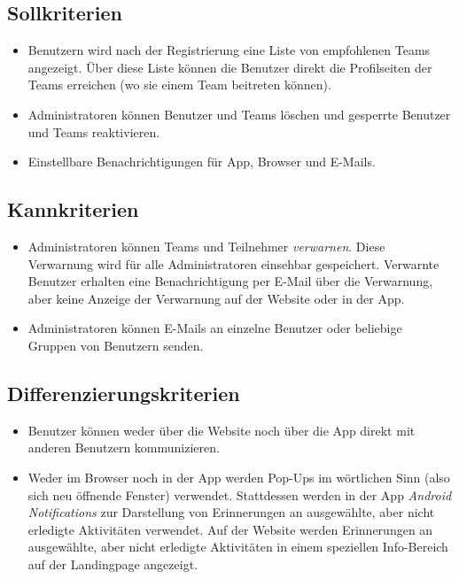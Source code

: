 \documentclass[10pt,a4paper]{article}
\begin{document}
	\subsection{Sollkriterien}
	\begin{itemize}
			\item Benutzern wird nach der Registrierung eine Liste von empfohlenen Teams angezeigt. Über diese Liste können die Benutzer direkt die Profilseiten der Teams erreichen (wo sie einem Team beitreten können).
			\item Administratoren können Benutzer und Teams löschen und gesperrte Benutzer und Teams reaktivieren.
			\item Einstellbare Benachrichtigungen für App, Browser und E-Mails.
		\end{itemize}
	\subsection{Kannkriterien}
	\begin{itemize}
                        \item Administratoren können Teams und Teilnehmer \emph{verwarnen}. Diese Verwarnung wird für alle Administratoren einsehbar gespeichert. Verwarnte Benutzer erhalten eine Benachrichtigung per E-Mail über die Verwarnung, aber keine Anzeige der Verwarnung auf der Website oder in der App.
			\item Administratoren können E-Mails an einzelne Benutzer oder beliebige Gruppen von Benutzern senden.
	\end{itemize}
	\subsection{Differenzierungskriterien}
	\begin{itemize}
		\item Benutzer können weder über die Website noch über die App direkt mit anderen Benutzern kommunizieren.
		\item Weder im Browser noch in der App werden Pop-Ups im wörtlichen Sinn (also sich neu öffnende Fenster) verwendet. Stattdessen werden in der App \emph{Android Notifications} zur Darstellung von Erinnerungen an ausgewählte, aber nicht erledigte Aktivitäten verwendet. Auf der Website werden Erinnerungen an ausgewählte, aber nicht erledigte Aktivitäten in einem speziellen Info-Bereich auf der Landingpage angezeigt. 
	\end{itemize}
\end{document}
